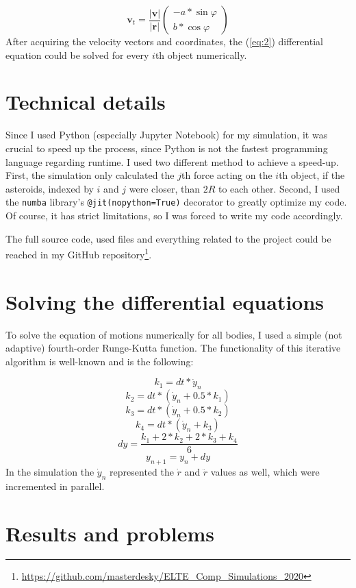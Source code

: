 \begin{multicols}{2}
\begin{equation} \label{eq:10}
\boldsymbol{v}_{t}
=
\frac{\left| \boldsymbol{v} \right|}{\left| \boldsymbol{r} \right|}
\begin{pmatrix}
-a * \sin{\varphi} \\
b * \cos{\varphi}
\end{pmatrix}
\end{equation}
After acquiring the velocity vectors and coordinates, the (\ref{eq:2}) differential equation could be solved for every $i$th object numerically.

\section{Technical details}
Since I used Python (especially Jupyter Notebook) for my simulation, it was crucial to speed up the process, since Python is not the fastest programming language regarding runtime. I used two different method to achieve a speed-up. First, the simulation only calculated the $j$th force acting on the $i$th object, if the asteroids, indexed by $i$ and $j$ were closer, than $2R$ to each other. Second, I used the \texttt{numba} library's \texttt{@jit(nopython=True)} decorator to greatly optimize my code. Of course, it has strict limitations, so I was forced to write my code accordingly. \par
The full source code, used files and everything related to the project could be reached in my GitHub repository\footnote{\url{https://github.com/masterdesky/ELTE\_Comp\_Simulations\_2020}}.

\section{Solving the differential equations}
To solve the equation of motions numerically for all bodies, I used a simple (not adaptive) fourth-order Runge-Kutta function. The functionality of this iterative algorithm is well-known and is the following:

\begin{equation}
k_{1} = dt * \dot{y}_{n}
\end{equation}
\begin{equation}
k_{2} = dt * \left( \dot{y}_{n} + 0.5 * k_1 \right)
\end{equation}
\begin{equation}
k_{3} = dt * \left( \dot{y}_{n} + 0.5 * k_2 \right)
\end{equation}
\begin{equation}
k_{4} = dt * \left( \dot{y}_{n} + k_3 \right)
\end{equation}
\begin{equation}
dy = \frac{k_{1} + 2 * k_{2} + 2 * k_{3} + k_{4}}{6}
\end{equation}
\begin{equation}
y_{n+1} = y_{n} + dy
\end{equation}
In the simulation the $\dot{y}_{n}$ represented the $\dot{r}$ and $\ddot{r}$ values as well, which were incremented in parallel.

\section{Results and problems}


\end{multicols}
